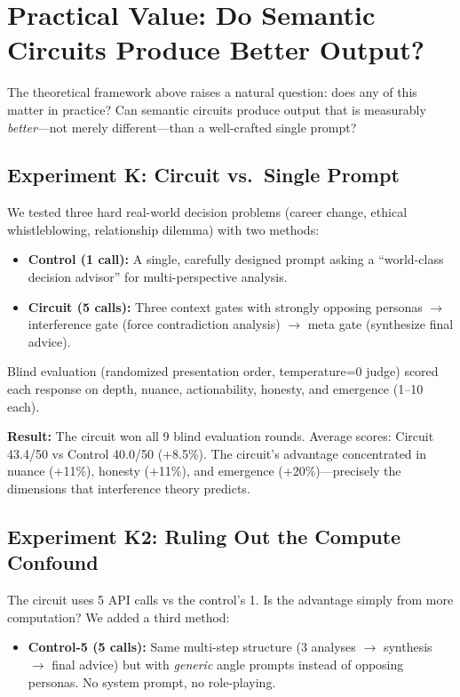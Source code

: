 \documentclass[11pt,a4paper]{article}
\begin{document}
\section{Practical Value: Do Semantic Circuits Produce Better Output?}

The theoretical framework above raises a natural question: does any of this matter in practice? Can semantic circuits produce output that is measurably \emph{better}---not merely different---than a well-crafted single prompt?

\subsection{Experiment K: Circuit vs.\ Single Prompt}

We tested three hard real-world decision problems (career change, ethical whistleblowing, relationship dilemma) with two methods:
\begin{itemize}
\item \textbf{Control (1 call):} A single, carefully designed prompt asking a ``world-class decision advisor'' for multi-perspective analysis.
\item \textbf{Circuit (5 calls):} Three context gates with strongly opposing personas $\to$ interference gate (force contradiction analysis) $\to$ meta gate (synthesize final advice).
\end{itemize}

Blind evaluation (randomized presentation order, temperature=0 judge) scored each response on depth, nuance, actionability, honesty, and emergence (1--10 each).

\textbf{Result:} The circuit won all 9 blind evaluation rounds. Average scores: Circuit 43.4/50 vs Control 40.0/50 (+8.5\%). The circuit's advantage concentrated in nuance (+11\%), honesty (+11\%), and emergence (+20\%)---precisely the dimensions that interference theory predicts.

\subsection{Experiment K2: Ruling Out the Compute Confound}

The circuit uses 5 API calls vs the control's 1. Is the advantage simply from more computation? We added a third method:
\begin{itemize}
\item \textbf{Control-5 (5 calls):} Same multi-step structure (3 analyses $\to$ synthesis $\to$ final advice) but with \emph{generic} angle prompts instead of opposing personas. No system prompt, no role-playing.
\end{itemize}
\end{document}
